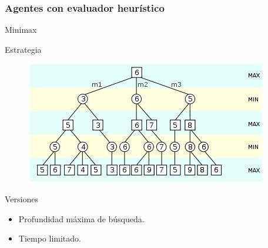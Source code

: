 \documentclass[10pt]{beamer}
\begin{document}
\begin{frame}[squeeze]
\frametitle{Agentes con evaluador heurístico}

{\huge Minimax}
\begin{block}{Estrategia}
\begin{figure}[t]
\centering
\includegraphics[scale=0.5]{imagenes/minimax.png}
\label{fig:jug_minimax}
\end{figure}
\end{block}

{\footnotesize 
\begin{exampleblock}{Versiones}
\begin{itemize}
	\item Profundidad máxima de búsqueda.
	\item Tiempo limitado.
\end{itemize}
\end{exampleblock}
}

\end{frame}
\end{document}

